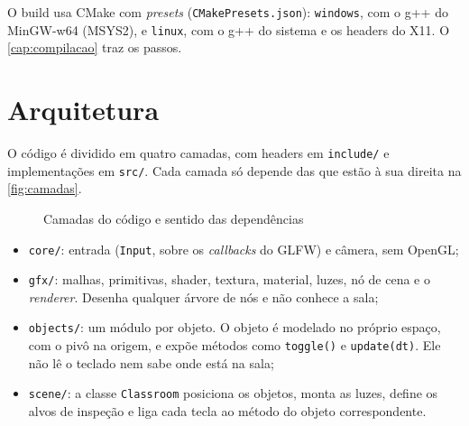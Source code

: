 \documentclass[
  12pt,          %
  oneside,       %
  a4paper,       %
  chapter=TITLE, %
  english,
  brazil,        %
]{abntex2}
\newcommand{\fonteautoras}{\fonte{Elaborada pelos autores (2026).}}
\begin{document}
O build usa CMake com \emph{presets} (\texttt{CMakePresets.json}): \texttt{windows}, com o g++ do MinGW-w64
(MSYS2), e \texttt{linux}, com o g++ do sistema e os headers do X11. O \autoref{cap:compilacao} traz os passos.

\chapter{Arquitetura}
\label{cap:arquitetura}

O código é dividido em quatro camadas, com headers em \texttt{include/} e implementações em \texttt{src/}.
Cada camada só depende das que estão à sua direita na \autoref{fig:camadas}.

\begin{figure}[htb]
  \centering
  \caption{Camadas do código e sentido das dependências}
  \label{fig:camadas}
  \fonteautoras
\end{figure}

\begin{itemize}
  \item \texttt{core/}: entrada (\texttt{Input}, sobre os \emph{callbacks} do GLFW) e câmera, sem OpenGL;
  \item \texttt{gfx/}: malhas, primitivas, shader, textura, material, luzes, nó de cena e o
        \emph{renderer}. Desenha qualquer árvore de nós e não conhece a sala;
  \item \texttt{objects/}: um módulo por objeto. O objeto é modelado no próprio espaço, com o pivô na origem,
        e expõe métodos como \texttt{toggle()} e \texttt{update(dt)}. Ele não lê o teclado nem sabe onde está
        na sala;
  \item \texttt{scene/}: a classe \texttt{Classroom} posiciona os objetos, monta as luzes, define os alvos de
        inspeção e liga cada tecla ao método do objeto correspondente.
\end{itemize}
\end{document}
